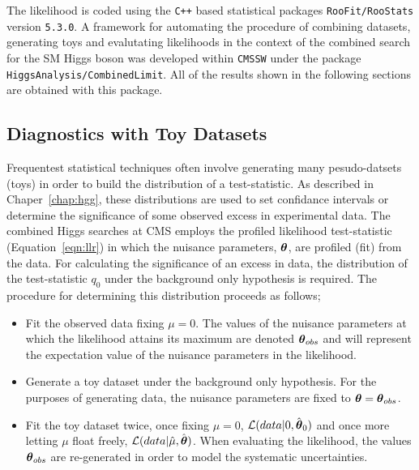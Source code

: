The likelihood is coded using the \texttt{C++} based 
statistical packages \texttt{RooFit/RooStats} version \texttt{5.3.0}. 
A framework for automating the procedure of combining datasets, generating toys
and evalutating likelihoods in the context of the combined search for the SM Higgs boson
was developed within \texttt{CMSSW} 
under the package \texttt{HiggsAnalysis/CombinedLimit}. %
All of the results shown in the following sections are obtained with this package.

\subsection{Diagnostics with Toy Datasets}
Frequentest statistical techniques often involve generating many pesudo-datsets (toys)
in order to build the distribution of a test-statistic. As described in Chaper~\ref{chap:hgg},
these distributions are used to set confidance intervals or determine the significance of
some observed excess in experimental data. The combined Higgs searches at CMS employs the
profiled likelihood test-statistic (Equation~\ref{eqn:llr}) in which the nuisance parameters,
${\boldsymbol{\theta}}$, are profiled (fit) from the data. 
For calculating the significance of an excess in data, the distribution
of the test-statistic $q_{0}$ under the background only hypothesis is required. 
The procedure for determining this distribution proceeds as follows;

\begin{itemize}
\item{Fit the observed data fixing $\mu=0$. The values of the nuisance parameters 
at which the likelihood attains its maximum are denoted ${\boldsymbol{\theta}}_{obs}$ and will represent 
the expectation value of the nuisance parameters in the likelihood.}
\item{Generate a toy dataset under the background only hypothesis. For the purposes of
generating data, the nuisance parameters are fixed to ${\boldsymbol{\theta}}={\boldsymbol{\theta}}_{obs}$.}
\item{Fit the toy dataset twice, once fixing $\mu=0$, $\mathcal{L}(data|0,\hat{{\boldsymbol{\theta}}}_{0})$ 
and once more letting 
$\mu$ float freely, $\mathcal{L}(data|\hat{\mu},\hat{{\boldsymbol{\theta}}})$. When 
evaluating the likelihood, the values ${\boldsymbol{\theta}}_{obs}$ are re-generated in order to 
model the systematic uncertainties.}
\end{itemize}

